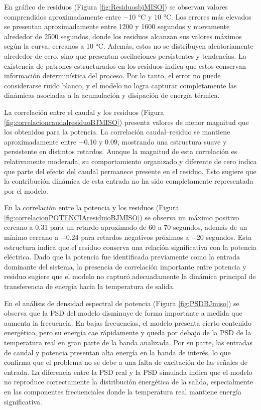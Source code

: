 \documentclass[11pt]{report}
\begin{document}
En gráfico de residuos (Figura \ref{fig:ResiduosbjMISO}) se observan valores comprendidos aproximadamente entre −10 °C y 10 °C. Los errores más elevados se presentan aproximadamente entre 1200 y 1600 segundos y nuevamente alrededor de 2500 segundos, donde los residuos alcanzan sus valores máximos según la curva, cercanos a 10 °C. Además, estos no se distribuyen aleatoriamente alrededor de cero, sino que presentan oscilaciones persistentes y tendencias. La existencia de patrones estructurados en los residuos indica que estos conservan información determinística del proceso. Por lo tanto, el error no puede considerarse ruido blanco, y el modelo no logra capturar completamente las dinámicas asociadas a la acumulación y disipación de energía térmica.

La correlación entre el caudal y los residuos (Figura \ref{fig:correlacioncaudalresiduoBJMISO}) presenta valores de menor magnitud que los obtenidos para la potencia. La correlación caudal–residuo se mantiene aproximadamente entre −0.10 y 0.09, mostrando una estructura suave y persistente en distintos retardos. Aunque la magnitud de esta correlación es relativamente moderada, su comportamiento organizado y diferente de cero indica que parte del efecto del caudal permanece presente en el residuo. Esto sugiere que la contribución dinámica de esta entrada no ha sido completamente representada por el modelo.

En la correlación entre la potencia y los residuos (Figura \ref{fig:correlacionPOTENCIAresiduioBJMISO})  se observa un máximo positivo cercano a 0.31 para un retardo aproximado de 60 a 70 segundos, además de un mínimo cercano a −0.24 para retardos negativos próximos a −20 segundos. Esta estructura indica que el residuo conserva una relación significativa con la potencia eléctrica. Dado que la potencia fue identificada previamente como la entrada dominante del sistema, la presencia de correlación importante entre potencia y residuo sugiere que el modelo no capturó adecuadamente la dinámica principal de transferencia de energía hacia la temperatura de salida. 

En el análisis de densidad espectral de potencia (Figura \ref{fig:PSDBJmiso}) se observa que la PSD del modelo disminuye de forma importante a medida que aumenta la frecuencia. En bajas frecuencias, el modelo presenta cierto contenido energético, pero su energía cae rápidamente y queda por debajo de la PSD de la temperatura real en gran parte de la banda analizada. Por su parte, las entradas de caudal y potencia presentan alta energía en la banda de interés, lo que confirma que el problema no se debe a una falta de excitación de las señales de entrada. La diferencia entre la PSD real y la PSD simulada indica que el modelo no reproduce correctamente la distribución energética de la salida, especialmente en las componentes frecuenciales donde la temperatura real mantiene energía significativa.
\end{document}
